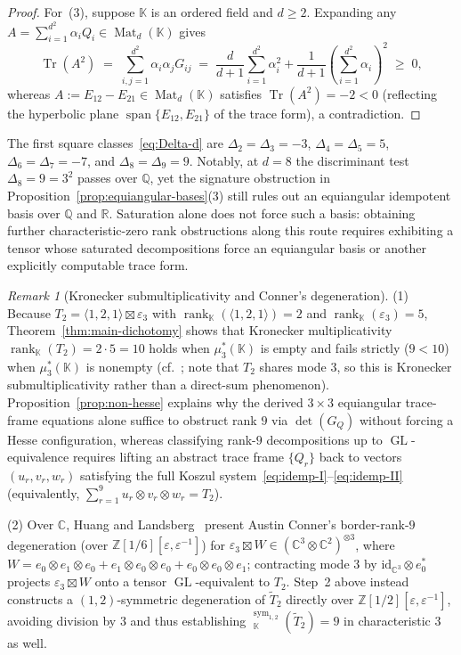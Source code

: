 \documentclass[11pt,reqno]{amsart}
\theoremstyle{definition}
\theoremstyle{remark}
\newtheorem{remark}[theorem]{Remark}
\numberwithin{equation}{section}
\newcommand{\KK}{\mathbb{K}}
\newcommand{\QQ}{\mathbb{Q}}
\newcommand{\RR}{\mathbb{R}}
\newcommand{\CC}{\mathbb{C}}
\newcommand{\ZZ}{\mathbb{Z}}
\DeclareMathOperator{\rk}{rank}
\DeclareMathOperator{\brk}{\underline{rank}}
\DeclareMathOperator{\Mat}{Mat}
\DeclareMathOperator{\GL}{GL}
\DeclareMathOperator{\Tr}{Tr}
\DeclareMathOperator{\spn}{span}
\begin{document}
\begin{proof}
For~\textup{(3)}, suppose $\KK$ is an ordered field and $d \ge 2$. Expanding any $A = \sum_{i=1}^{d^2} \alpha_i Q_i \in \Mat_d(\KK)$ gives
\[
  \Tr(A^2) \;=\; \sum_{i,j=1}^{d^2} \alpha_i \alpha_j G_{ij} \;=\; \frac{d}{d + 1}\sum_{i=1}^{d^2} \alpha_i^2 + \frac{1}{d + 1}\left(\sum_{i=1}^{d^2} \alpha_i\right)^2 \;\ge\; 0,
\]
whereas $A := E_{12} - E_{21} \in \Mat_d(\KK)$ satisfies $\Tr(A^2) = -2 < 0$ (reflecting the hyperbolic plane $\spn\{E_{12}, E_{21}\}$ of the trace form), a contradiction.
\end{proof}

The first square classes~\eqref{eq:Delta-d} are $\Delta_2 = \Delta_3 = -3$, $\Delta_4 = \Delta_5 = 5$, $\Delta_6 = \Delta_7 = -7$, and $\Delta_8 = \Delta_9 = 9$. Notably, at $d = 8$ the discriminant test $\Delta_8 = 9 = 3^2$ passes over $\QQ$, yet the signature obstruction in Proposition~\ref{prop:equiangular-bases}(3) still rules out an equiangular idempotent basis over $\QQ$ and $\RR$. Saturation alone does not force such a basis: obtaining further characteristic-zero rank obstructions along this route requires exhibiting a tensor whose saturated decompositions force an equiangular basis or another explicitly computable trace form.

\begin{remark}[Kronecker submultiplicativity and Conner's degeneration]\label{rem:kronecker-conner}
(1) Because $T_2 = \langle 1, 2, 1 \rangle \boxtimes \varepsilon_3$ with $\rk_{\KK}(\langle 1, 2, 1 \rangle) = 2$ and $\rk_{\KK}(\varepsilon_3) = 5$, Theorem~\ref{thm:main-dichotomy} shows that Kronecker multiplicativity $\rk_{\KK}(T_2) = 2 \cdot 5 = 10$ holds when $\mu_3^*(\KK)$ is empty and fails strictly ($9 < 10$) when $\mu_3^*(\KK)$ is nonempty (cf.~\cite{CJZ2018,CHL2023}; note that $T_2$ shares mode $3$, so this is Kronecker submultiplicativity rather than a direct-sum phenomenon). Proposition~\ref{prop:non-hesse} explains why the derived $3 \times 3$ equiangular trace-frame equations alone suffice to obstruct rank $9$ via $\det(G_Q)$ without forcing a Hesse configuration, whereas classifying rank-$9$ decompositions up to $\GL$-equivalence requires lifting an abstract trace frame $\{Q_r\}$ back to vectors $(u_r, v_r, w_r)$ satisfying the full Koszul system~\eqref{eq:idemp-I}--\eqref{eq:idemp-II} (equivalently, $\sum_{r=1}^9 u_r \otimes v_r \otimes w_r = T_2$).

(2) Over $\CC$, Huang and Landsberg~\cite[Proposition~8.4]{HuangLandsberg2026} present Austin Conner's border-rank-$9$ degeneration (over $\ZZ[1/6][\varepsilon, \varepsilon^{-1}]$) for $\varepsilon_3 \boxtimes W \in (\CC^3 \otimes \CC^2)^{\otimes 3}$, where $W = e_0 \otimes e_1 \otimes e_0 + e_1 \otimes e_0 \otimes e_0 + e_0 \otimes e_0 \otimes e_1$; contracting mode $3$ by $\mathrm{id}_{\CC^3} \otimes e_0^*$ projects $\varepsilon_3 \boxtimes W$ onto a tensor $\GL$-equivalent to $T_2$. Step~2 above instead constructs a $(1,2)$-symmetric degeneration of $\widetilde{T}_2$ directly over $\ZZ[1/2][\varepsilon, \varepsilon^{-1}]$, avoiding division by $3$ and thus establishing $\brk_{\KK}^{\mathrm{sym}_{1,2}}(\widetilde{T}_2) = 9$ in characteristic $3$ as well.
\end{remark}
\end{document}
